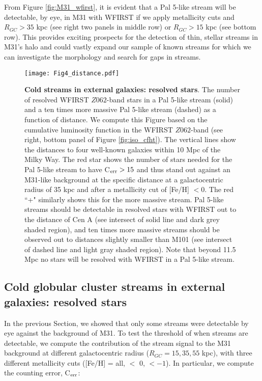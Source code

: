 \documentclass[twocolumn]{aastex62}
\begin{document}
From Figure \ref{fig:M31_wfirst}, it is evident that a Pal 5-like stream will be detectable, by eye, in M31 with WFIRST if we apply metallicity cuts and $R_{GC} > 35$ kpc (see right two panels in middle row) or  $R_{GC} > 15$ kpc  (see  bottom row). This provides exciting prospects for the detection of thin, stellar streams in M31's halo and could vastly expand our sample of known streams for which we can investigate the morphology and search for gaps in streams. 




\begin{figure}
\centerline{\texttt{[image: Fig4\_distance.pdf]}}
\caption{{\bf Cold streams in external galaxies: resolved stars}. The number of resolved WFIRST $Z062$-band stars in a Pal 5-like stream (solid) and a ten times more massive Pal 5-like stream (dashed) as a function of distance. We compute this Figure based on the cumulative luminosity function in the WFIRST $Z062$-band (see right, bottom panel of Figure \ref{fig:iso_cfht}). The vertical lines show the distances to four well-known galaxies within 10 Mpc of the Milky Way. The red star shows the number of stars needed for the Pal 5-like stream to have  C$_{\rm err} > 15$ and thus stand out against an M31-like background at the specific distance at a galactocentric radius of 35 kpc and after a metallicity cut of [Fe/H] $< 0$. The red ``+" similarly shows this for the more massive stream. 
Pal 5-like streams should be detectable in resolved stars with WFIRST out to the distance of Cen A (see intersect of solid line and dark grey shaded region), and ten times more massive streams should be observed out to distances slightly smaller than M101 (see intersect of dashed line and light gray shaded region). %
Note that beyond 11.5 Mpc no stars will be resolved with WFIRST in a Pal 5-like stream.}
\label{fig:distance}
\end{figure}


\subsection{Cold globular cluster streams in external galaxies: resolved stars}
\label{sec:resother}
In the previous Section, we showed that only some streams were detectable by eye against the background of M31. To test the threshold of when streams are detectable, we compute the contribution of the stream signal to the M31 background at different galactocentric radius ($R_{GC} = 15, 35, 55$ kpc), with three different metallicity cuts ([Fe/H] = all, $<$ 0, $< -1$). In particular, we compute the counting error, C$_{\rm err}$: 
\end{document}
